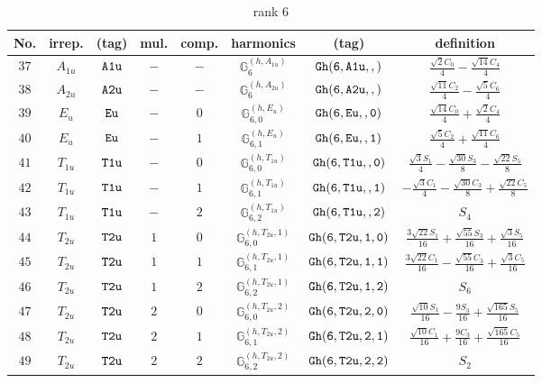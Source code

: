 \documentclass[fleqn,8pt]{jsarticle}
\begin{document}
\begin{table}[ht!]
\begin{center}
\caption{rank 6}
\renewcommand{\arraystretch}{1.3}
\begin{tabular}{cccccccc} \hline \hline
No. & irrep. & (tag) & mul. & comp. & harmonics & (tag) & definition \\ \hline
$ 37 $ & $ A_{1u} $ & $ {\tt A1u} $ & $ - $ & $ - $ & $ \mathbb{G}_{6}^{(h,A_{1u})} $ & $ {\tt Gh(6,A1u,,)} $ & $ \frac{\sqrt{2} C_{0}}{4} - \frac{\sqrt{14} C_{4}}{4} $ \\
$ 38 $ & $ A_{2u} $ & $ {\tt A2u} $ & $ - $ & $ - $ & $ \mathbb{G}_{6}^{(h,A_{2u})} $ & $ {\tt Gh(6,A2u,,)} $ & $ \frac{\sqrt{11} C_{2}}{4} - \frac{\sqrt{5} C_{6}}{4} $ \\
$ 39 $ & $ E_{u} $ & $ {\tt Eu} $ & $ - $ & $ 0 $ & $ \mathbb{G}_{6,0}^{(h,E_{u})} $ & $ {\tt Gh(6,Eu,,0)} $ & $ \frac{\sqrt{14} C_{0}}{4} + \frac{\sqrt{2} C_{4}}{4} $ \\
$ 40 $ & $ E_{u} $ & $ {\tt Eu} $ & $ - $ & $ 1 $ & $ \mathbb{G}_{6,1}^{(h,E_{u})} $ & $ {\tt Gh(6,Eu,,1)} $ & $ \frac{\sqrt{5} C_{2}}{4} + \frac{\sqrt{11} C_{6}}{4} $ \\
$ 41 $ & $ T_{1u} $ & $ {\tt T1u} $ & $ - $ & $ 0 $ & $ \mathbb{G}_{6,0}^{(h,T_{1u})} $ & $ {\tt Gh(6,T1u,,0)} $ & $ \frac{\sqrt{3} S_{1}}{4} - \frac{\sqrt{30} S_{3}}{8} - \frac{\sqrt{22} S_{5}}{8} $ \\
$ 42 $ & $ T_{1u} $ & $ {\tt T1u} $ & $ - $ & $ 1 $ & $ \mathbb{G}_{6,1}^{(h,T_{1u})} $ & $ {\tt Gh(6,T1u,,1)} $ & $ - \frac{\sqrt{3} C_{1}}{4} - \frac{\sqrt{30} C_{3}}{8} + \frac{\sqrt{22} C_{5}}{8} $ \\
$ 43 $ & $ T_{1u} $ & $ {\tt T1u} $ & $ - $ & $ 2 $ & $ \mathbb{G}_{6,2}^{(h,T_{1u})} $ & $ {\tt Gh(6,T1u,,2)} $ & $ S_{4} $ \\
$ 44 $ & $ T_{2u} $ & $ {\tt T2u} $ & $ 1 $ & $ 0 $ & $ \mathbb{G}_{6,0}^{(h,T_{2u},1)} $ & $ {\tt Gh(6,T2u,1,0)} $ & $ \frac{3 \sqrt{22} S_{1}}{16} + \frac{\sqrt{55} S_{3}}{16} + \frac{\sqrt{3} S_{5}}{16} $ \\
$ 45 $ & $ T_{2u} $ & $ {\tt T2u} $ & $ 1 $ & $ 1 $ & $ \mathbb{G}_{6,1}^{(h,T_{2u},1)} $ & $ {\tt Gh(6,T2u,1,1)} $ & $ \frac{3 \sqrt{22} C_{1}}{16} - \frac{\sqrt{55} C_{3}}{16} + \frac{\sqrt{3} C_{5}}{16} $ \\
$ 46 $ & $ T_{2u} $ & $ {\tt T2u} $ & $ 1 $ & $ 2 $ & $ \mathbb{G}_{6,2}^{(h,T_{2u},1)} $ & $ {\tt Gh(6,T2u,1,2)} $ & $ S_{6} $ \\
$ 47 $ & $ T_{2u} $ & $ {\tt T2u} $ & $ 2 $ & $ 0 $ & $ \mathbb{G}_{6,0}^{(h,T_{2u},2)} $ & $ {\tt Gh(6,T2u,2,0)} $ & $ \frac{\sqrt{10} S_{1}}{16} - \frac{9 S_{3}}{16} + \frac{\sqrt{165} S_{5}}{16} $ \\
$ 48 $ & $ T_{2u} $ & $ {\tt T2u} $ & $ 2 $ & $ 1 $ & $ \mathbb{G}_{6,1}^{(h,T_{2u},2)} $ & $ {\tt Gh(6,T2u,2,1)} $ & $ \frac{\sqrt{10} C_{1}}{16} + \frac{9 C_{3}}{16} + \frac{\sqrt{165} C_{5}}{16} $ \\
$ 49 $ & $ T_{2u} $ & $ {\tt T2u} $ & $ 2 $ & $ 2 $ & $ \mathbb{G}_{6,2}^{(h,T_{2u},2)} $ & $ {\tt Gh(6,T2u,2,2)} $ & $ S_{2} $ \\
 \hline \hline
\end{tabular}
\end{center}
\end{table}
\end{document}
